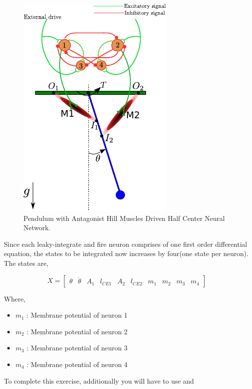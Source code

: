 \documentclass{cmc}
\begin{document}
\begin{figure}[H]
  \centering
  \includegraphics[scale=1.5]{figures/pendulum_muscles_neurons.pdf}
  \caption{Pendulum with Antagonist Hill Muscles Driven Half Center
    Neural Network.}
  \label{fig:p_muscles_neurons}
\end{figure}

Since each leaky-integrate and fire neuron comprises of one first
order differential equation, the states to be integrated now increases
by four(one state per neuron). The states are,


\begin{equation}
  \label{eq:7_lab6}
  X = \begin{bmatrix}
    \theta & \dot{\theta} & A_1 & l_{CE1} & A_2 & l_{CE2} & m_1 & m_2 & m_3 & m_4
  \end{bmatrix}
\end{equation}

Where,
\begin{itemize}
\item $m_1$ : Membrane potential of neuron 1
\item $m_2$ : Membrane potential of neuron 2
\item $m_3$ : Membrane potential of neuron 3
\item $m_4$ : Membrane potential of neuron 4
\end{itemize}

To complete this exercise, additionally you will have to use
 and 
\end{document}
